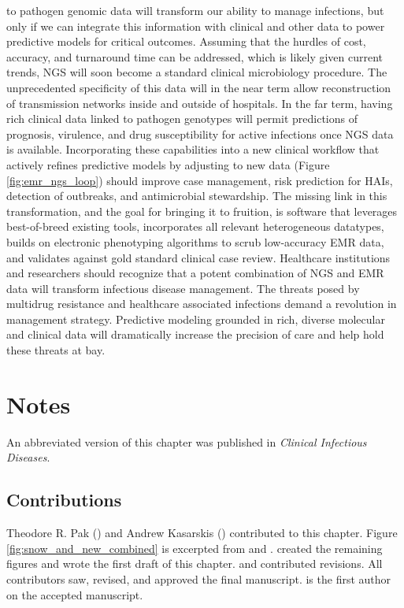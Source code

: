 to pathogen genomic data will transform our ability to manage infections, but only if we can integrate this information with clinical and other data to power predictive models for critical outcomes. Assuming that the hurdles of cost, accuracy, and turnaround time can be addressed, which is likely given current trends, NGS will soon become a standard clinical microbiology procedure. The unprecedented specificity of this data will in the near term allow reconstruction of transmission networks inside and outside of hospitals. In the far term, having rich clinical data linked to pathogen genotypes will permit predictions of prognosis, virulence, and drug susceptibility for active infections once NGS data is available. Incorporating these capabilities into a new clinical workflow that actively refines predictive models by adjusting to new data (Figure \ref{fig:emr_ngs_loop}) should improve case management, risk prediction for HAIs, detection of outbreaks, and antimicrobial stewardship. The missing link in this transformation, and the goal for bringing it to fruition, is software that leverages best-of-breed existing tools, incorporates all relevant heterogeneous datatypes, builds on electronic phenotyping algorithms to scrub low-accuracy EMR data, and validates against gold standard clinical case review.
Healthcare institutions and researchers should recognize that a potent combination of NGS and EMR data will transform infectious disease management. The threats posed by multidrug resistance and healthcare associated infections demand a revolution in management strategy. Predictive modeling grounded in rich, diverse molecular and clinical data will dramatically increase the precision of care and help hold these threats at bay.

\section*{Notes}

An abbreviated version of this chapter was published in \textit{Clinical Infectious Diseases}.\autocite{Pak2015}

\subsection*{Contributions}

Theodore R. Pak () and Andrew Kasarskis () contributed to this chapter. Figure \ref{fig:snow_and_new_combined} is excerpted from \textcite{Nagar2014} and \textcite{Snow1855}.  created the remaining figures and wrote the first draft of this chapter.  and  contributed revisions. All contributors saw, revised, and approved the final manuscript.  is the first author on the accepted manuscript.

